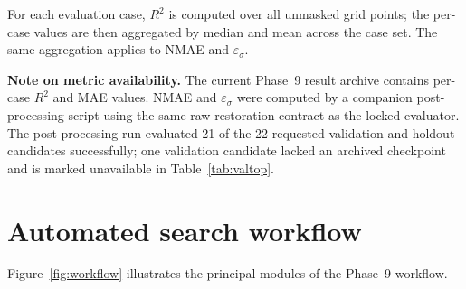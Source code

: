﻿\documentclass[preprint,12pt,authoryear]{elsarticle}
\begin{document}
For each evaluation case, $R^{2}$ is computed over all unmasked grid points; the per-case values are then aggregated by median and mean across the case set.
The same aggregation applies to NMAE and $\varepsilon_{\sigma}$.

\medskip
\noindent\textbf{Note on metric availability.}\quad
The current Phase~9 result archive contains per-case $R^{2}$ and MAE values.
NMAE and $\varepsilon_{\sigma}$ were computed by a companion post-processing script using the same raw restoration contract as the locked evaluator. The post-processing run evaluated 21 of the 22 requested validation and holdout candidates successfully; one validation candidate lacked an archived checkpoint and is marked unavailable in Table~\ref{tab:valtop}.

\section{Automated search workflow}
\label{sec:workflow}

Figure~\ref{fig:workflow} illustrates the principal modules of the Phase~9 workflow.
\end{document}
